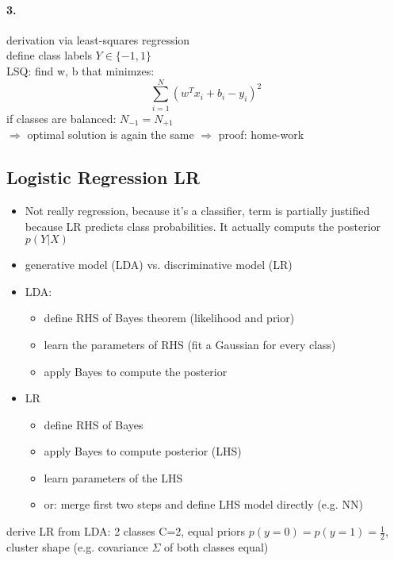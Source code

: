 \documentclass[11pt]{article}
\begin{document}
      \paragraph{3.}
        derivation via least-squares regression \\
        define class labels $Y \in \{ -1, 1\}$ \\
        LSQ: find w, b that minimzes:
        \begin{equation*}
          \sum_{i=1}^{N}(w^Tx_{i} + b_{i} - y_{i})^2
        \end{equation*}
        if classes are balanced: $N_{-1} = N_{+1}$ \\
        $\Rightarrow$ optimal solution is again the same $\Rightarrow$ proof: home-work
    \subsection{Logistic Regression LR}
      \begin{itemize}
        \item Not really regression, because it's a classifier, term is partially justified because LR
          predicts class probabilities. It actually computs the posterior $p(Y|X)$
        \item generative model (LDA) vs. discriminative model (LR)
        \item LDA:
        \begin{itemize}
          \item define RHS of Bayes theorem (likelihood and prior)
          \item learn the parameters of RHS (fit a Gaussian for every class)
          \item  apply Bayes to compute the posterior
        \end{itemize}
        \item LR
        \begin{itemize}
          \item define RHS of Bayes
          \item apply Bayes to compute posterior (LHS)
          \item learn parameters of the LHS
          \item or: merge first two steps and define LHS model directly (e.g. NN)
        \end{itemize}
      \end{itemize}
      derive LR from LDA: 2 classes C=2, equal priors $p(y=0) = p(y=1) = \frac{1}{2}$,
      cluster shape (e.g. covariance $\Sigma$ of both classes equal)
\end{document}
